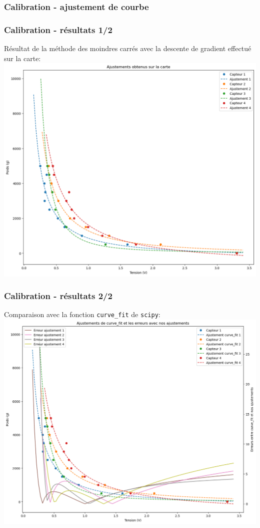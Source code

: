 \begin{frame}
\frametitle{Calibration - ajustement de courbe}

\end{frame}

\begin{frame}
\frametitle{Calibration - résultats 1/2}
Résultat de la méthode des moindres carrés avec la descente de gradient effectué sur la carte:\\
\includegraphics[scale=0.3]{./figures/cal_01.png}
\end{frame}

\begin{frame}
\frametitle{Calibration - résultats 2/2}
Comparaison avec la fonction \texttt{curve\_fit} de \texttt{scipy}:\\
\includegraphics[scale=0.3]{./figures/cal_02.png}
\end{frame}


